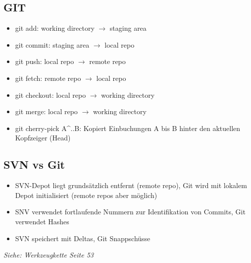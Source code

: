 \subsection{GIT}
\begin{itemize}
    \item git add: working directory $\rightarrow$ staging area
    \item git commit: staging area $\rightarrow$ local repo
    \item git push: local repo $\rightarrow$ remote repo
    \item git fetch: remote repo $\rightarrow$ local repo
    \item git checkout: local repo $\rightarrow$ working directory
    \item git merge: local repo $\rightarrow$ working directory
    \item git cherry-pick A\textasciicircum ..B: Kopiert Einbuchungen A bis B hinter den aktuellen Kopfzeiger (Head)
\end{itemize}




\subsection{SVN vs Git}
\begin{itemize}
    \item SVN-Depot liegt grundsätzlich entfernt (remote repo), Git wird mit lokalem Depot initialisiert (remote repos aber möglich)
    \item SNV verwendet fortlaufende Nummern zur Identifikation von Commits, Git verwendet Hashes
    \item SVN speichert mit Deltas, Git Snappschüsse
\end{itemize}

\textit{Siehe: Werkzeugkette Seite 53}
